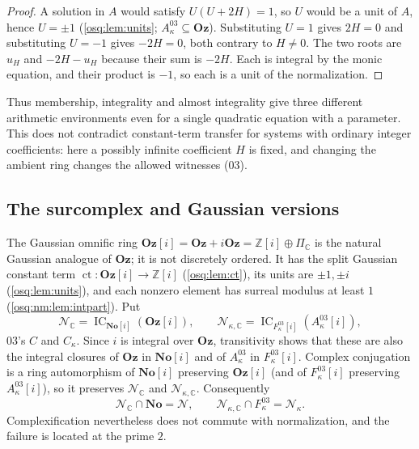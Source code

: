 \documentclass[11pt,letterpaper]{article}
\numberwithin{equation}{section}
\theoremstyle{definition}
\theoremstyle{remark}
\theoremstyle{plain}
\newcommand{\No}{\mathbf{No}}
\newcommand{\Oz}{\mathbf{Oz}}
\newcommand{\SC}{\No[i]}
\newcommand{\GOz}{\Oz[i]}
\newcommand{\Z}{\mathbb Z}
\newcommand{\C}{\mathbb C}
\newcommand{\NN}{\mathcal N}         %
\newcommand{\ct}{\operatorname{ct}}
\newcommand{\IC}{\operatorname{IC}}
\begin{document}
\begin{proof}
A solution in $A$ would satisfy $U(U+2H)=1$, so $U$ would be a unit of $A$, hence
$U=\pm1$ (\cref{osq:lem:units}; $A^{03}_\kappa\subseteq\Oz$). Substituting $U=1$ gives
$2H=0$ and substituting $U=-1$ gives $-2H=0$, both contrary to $H\ne0$. The two roots are
$u_H$ and $-2H-u_H$ because their sum is $-2H$. Each is integral by the monic equation, and
their product is $-1$, so each is a unit of the normalization.
\end{proof}

Thus membership, integrality and almost integrality give three different arithmetic
environments even for a single quadratic equation with a parameter. This does not
contradict constant-term transfer for systems with ordinary integer coefficients: here a
possibly infinite coefficient $H$ is fixed, and changing the ambient ring changes the
allowed witnesses (03).

\subsection{The surcomplex and Gaussian versions}\label{osq:nm:sub:complex}

The Gaussian omnific ring $\GOz=\Oz+i\Oz=\Z[i]\oplus\Pi_\C$ is the natural Gaussian
analogue of $\Oz$; it is not discretely ordered. It has the split Gaussian constant term
$\ct:\GOz\to\Z[i]$ (\cref{osq:lem:ct}), its units are $\pm1,\pm i$ (\cref{osq:lem:units}),
and each nonzero element has surreal modulus at least $1$ (\cref{osq:nm:lem:intpart}). Put
\begin{equation}\label{osq:nm:eq:complexnormalization}
 \NN_\C=\IC_{\SC}(\GOz),\qquad
 \NN_{\kappa,\C}=\IC_{F^{03}_\kappa[i]}(A^{03}_\kappa[i]),
\end{equation}
03's $C$ and $C_\kappa$. Since $i$ is integral over $\Oz$, transitivity shows that these are
also the integral closures of $\Oz$ in $\SC$ and of $A^{03}_\kappa$ in $F^{03}_\kappa[i]$.
Complex conjugation is a ring automorphism of $\SC$ preserving $\GOz$ (and of
$F^{03}_\kappa[i]$ preserving $A^{03}_\kappa[i]$), so it preserves $\NN_\C$ and
$\NN_{\kappa,\C}$. Consequently
\begin{equation}\label{osq:nm:eq:realintersection}
 \NN_\C\cap\No=\NN,\qquad \NN_{\kappa,\C}\cap F^{03}_\kappa=\NN_\kappa .
\end{equation}
Complexification nevertheless does not commute with normalization, and the failure is
located at the prime $2$.
\end{document}
